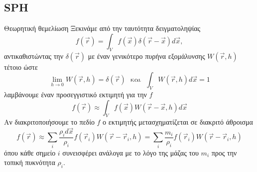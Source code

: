 \documentclass[8pt,sans,mathserif,aspectratio=43]{beamer}
\newcommand{\eng}[1]{\selectlanguage{english}#1\selectlanguage{greek}}
\begin{document}
\subsection{\texorpdfstring{\eng{SPH}}{SPH}}

\begin{frame}{Θεωρητική θεμελίωση}
  Ξεκινάμε από την ταυτότητα δειγματοληψίας
  \begin{equation*}
    f(\vec{r}) = \int_Vf(\vec{x}) \delta(\vec{r} - \vec{x}) d\vec{x},
  \end{equation*}
  \pause αντικαθιστώντας την $\delta(\vec{r})$ με έναν γενικότερο πυρήνα εξομάλυνσης
  $W(\vec{r}, h)$ τέτοιο ώστε
  \begin{equation*}
    \lim_{h\to0}W(\vec{r}, h) = \delta(\vec{r})\ \ \
    \text{και}\ \ \
    \int_VW(\vec{r}, h) d\vec{x} = 1
  \end{equation*}
  \pause λαμβάνουμε έναν προσεγγιστικό εκτιμητή για την $f$
  \begin{equation*}
    f(\vec{r}) \approx \int_V f(\vec{x}) W(\vec{r}-\vec{x}, h) d\vec{x}
  \end{equation*}
  \pause Αν διακριτοποιήσουμε το πεδίο $f$ ο εκτιμητής μετασχηματίζεται σε διακριτό
  άθροισμα
  \begin{equation*}
    f(\vec{r}) \approx \sum_i \frac{\rho_i d\vec{x}}{\rho_i} f(\vec{r}_i) W(\vec{r}-\vec{r}_i, h)
    = \sum_i \frac{m_i}{\rho_i} f(\vec{r}_i) W(\vec{r}-\vec{r}_i, h)
  \end{equation*}
  όπου κάθε σημείο $i$ συνεισφέρει ανάλογα με το λόγο της μάζας του $m_i$ προς την τοπική
  πυκνότητα $\rho_i$.
\end{frame}

\end{document}
